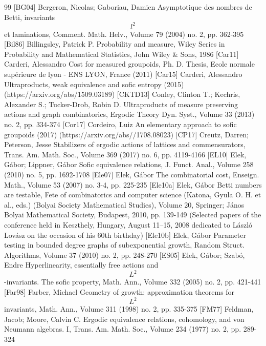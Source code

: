 \documentclass[10pt]{amsart}
\theoremstyle{definition}
\begin{document}
\begin{thebibliography}{99}
 [BG04] Bergeron, Nicolas; Gaboriau, Damien Asymptotique des nombres de Betti, invariants $$l^2$$ et laminations, Comment. Math. Helv., Volume 79 (2004) no. 2, pp. 362-395
 [Bil86] Billingsley, Patrick P. Probability and measure, Wiley Series in Probability and Mathematical Statistics, John Wiley \& Sons, 1986
 [Car11] Carderi, Alessandro Cost for measured groupoids, Ph. D. Thesis, Ecole normale supérieure de lyon - ENS LYON, France (2011)
 [Car15] Carderi, Alessandro Ultraproducts, weak equivalence and sofic entropy (2015) (https://arxiv.org/abs/1509.03189)
 [CKTD13] Conley, Clinton T.; Kechris, Alexander S.; Tucker-Drob, Robin D. Ultraproducts of measure preserving actions and graph combinatorics, Ergodic Theory Dyn. Syst., Volume 33 (2013) no. 2, pp. 334-374
 [Cor17] Cordeiro, Luiz An elementary approach to sofic groupoids (2017) (https://arxiv.org/abs//1708.08023)
 [CP17] Creutz, Darren; Peterson, Jesse Stabilizers of ergodic actions of lattices and commensurators, Trans. Am. Math. Soc., Volume 369 (2017) no. 6, pp. 4119-4166
 [EL10] Elek, Gábor; Lippner, Gábor Sofic equivalence relations, J. Funct. Anal., Volume 258 (2010) no. 5, pp. 1692-1708
 [Ele07] Elek, Gábor The combinatorial cost, Enseign. Math., Volume 53 (2007) no. 3-4, pp. 225-235
 [Ele10a] Elek, Gábor Betti numbers are testable, Fete of combinatorics and computer science (Katona, Gyula O. H. et al., eds.) (Bolyai Society Mathematical Studies), Volume 20, Springer; János Bolyai Mathematical Society, Budapest, 2010, pp. 139-149 (Selected papers of the conference held in Keszthely, Hungary, August 11–15, 2008 dedicated to László Lovász on the occasion of his 60th birthday)
 [Ele10b] Elek, Gábor Parameter testing in bounded degree graphs of subexponential growth, Random Struct. Algorithms, Volume 37 (2010) no. 2, pp. 248-270
 [ES05] Elek, Gábor; Szabó, Endre Hyperlinearity, essentially free actions and $${L}^2$$-invariants. The sofic property, Math. Ann., Volume 332 (2005) no. 2, pp. 421-441
 [Far98] Farber, Michael Geometry of growth: approximation theorems for $${L}^2$$ invariants, Math. Ann., Volume 311 (1998) no. 2, pp. 335-375
 [FM77] Feldman, Jacob; Moore, Calvin C. Ergodic equivalence relations, cohomology, and von Neumann algebras. I, Trans. Am. Math. Soc., Volume 234 (1977) no. 2, pp. 289-324

\end{thebibliography}
\end{document}
